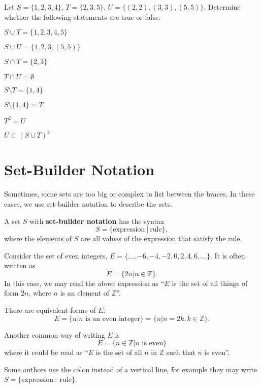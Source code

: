 \begin{exercise}
    Let $S = \{1, 2, 3, 4\}$, $T = \{2, 3, 5\}$, $U = \{(2, 2), (3, 3), (5, 5)\}$. Determine whether the following statements are true or false.
    \begin{multicols}{2}
        \begin{partquestions}{\alph*}
            \item $S \cup T = \{1, 2, 3, 4, 5\}$
            \item $S \cup U = \{1, 2, 3, (5, 5)\}$
            \item $S \cap T = \{2, 3\}$
            \item $T \cap U = \emptyset$
            \item $S \setminus T = \{1, 4\}$
            \item $S \setminus \{1, 4\} = T$
            \item $T^2 = U$
            \item $U \subset (S \cup T)^2$
        \end{partquestions}
    \end{multicols}
\end{exercise}

\newpage

\section{Set-Builder Notation}
Sometimes, some sets are too big or complex to list between the braces. In these cases, we use set-builder notation to describe the sets.
\begin{definition}
    A set $S$ with \textbf{set-builder notation} has the syntax
    \[
        S = \{\mathrm{expression} \ | \ \mathrm{rule}\},
    \]
    where the elements of $S$ are all values of the expression that satisfy the rule.
\end{definition}

\begin{example}
    Consider the set of even integers, $E = \{\dots, -6, -4, -2, 0, 2, 4, 6, \dots\}$. It is often written as
    \[
        E = \{2n \vert n \in \mathbb{Z}\}.
    \]
    In this case, we may read the above expression as ``$E$ is the set of all things of form $2n$, where $n$ is an element of $\mathbb{Z}$''.

    There are equivalent forms of $E$:
    \[
        E = \{n \vert n \textrm{ is an even integer}\} = \{n \vert n = 2k, k \in \mathbb{Z}\}.
    \]

    Another common way of writing $E$ is
    \[
        E = \{n \in \mathbb{Z} \vert n \textrm{ is even}\}
    \]
    where it could be read as ``$E$ is the set of all $n$ in $\mathbb{Z}$ such that $n$ is even''.
\end{example}
\begin{remark}
    Some authors use the colon instead of a vertical line, for example they may write $S = \{\mathrm{expression} \ : \ \mathrm{rule}\}$.
\end{remark}

